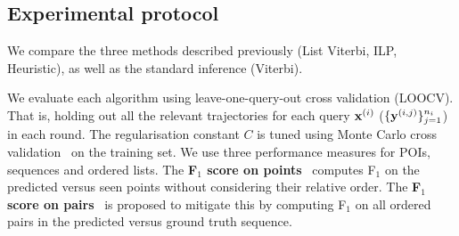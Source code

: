 \begin{table}[t]
	\begin{minipage}[t]{\linewidth}
		\label{tab:data}
	\end{minipage}
\end{table}

%
\subsection{Experimental protocol}

We compare the three methods described previously ({\sc List Viterbi}, {\sc ILP}, {\sc Heuristic}),
as well as the standard inference ({\sc Viterbi}).

We evaluate each algorithm using leave-one-query-out cross validation (LOOCV).
That is, holding out all the relevant trajectories for each query $\mathbf{x}^{(i)}$ (\ie $\{\mathbf{y}^{(i,j)}\}_{j=1}^{n_i}$) in each round.
The regularisation constant $C$ is tuned using Monte Carlo cross validation~\cite{burman1989comparative} on the training set.
We use three performance measures for POIs, sequences and ordered lists.
The {\bf F$_1$ score on points}~\cite{ijcai15} computes F$_1$ on the predicted versus seen points
without considering their relative order.
The {\bf F$_1$ score on pairs}~\cite{cikm16paper} is proposed to mitigate this by computing F$_1$ on all ordered pairs in the predicted versus ground truth sequence. %


